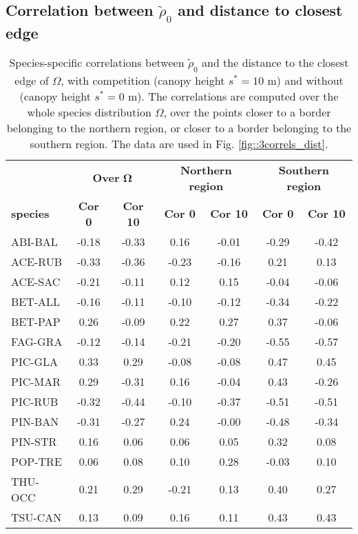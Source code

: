 \documentclass[letterpaper, 12pt]{article}
\newcommand {\s}{{s}^{*}}
\theoremstyle{theo}
\begin{document}
\begin{refsection}
\begin{onehalfspace}
\subsection{Correlation between $ \tilde \rho_0 $ and distance to closest edge}
\begin{table}[ht]
\centering
\caption[$ \text{Cor}(\tilde \rho_0, \text{distance closest edge}) $]{Species-specific correlations between $ \tilde \rho_0 $ and the distance to the closest edge of $ \Omega $, with competition (canopy height $ \s = 10 $ m) and without (canopy height $ \s = 0 $ m). The correlations are computed over the whole species distribution $ \Omega $, over the points closer to a border belonging to the northern region, or closer to a border belonging to the southern region. The data are used in Fig. \ref{fig::3correls_dist}. \label{tab::R0correl_dist}}
\begin{tabular}{lcccccc}
	\toprule
	~ & \multicolumn{2}{c}{\textbf{Over} $ \bm \Omega $} & \multicolumn{2}{c}{\textbf{Northern region}} & \multicolumn{2}{c}{\textbf{Southern region}} \\
		\cmidrule(lr){2-3} \cmidrule(lr){4-5} \cmidrule(lr){6-7}
		\textbf{species} & \textbf{Cor 0} & \textbf{Cor 10} & \textbf{Cor 0} & \textbf{Cor 10} & \textbf{Cor 0} & \textbf{Cor 10} \\
	\midrule
		ABI-BAL & -0.18 & -0.33 & 0.16 & -0.01 & -0.29 & -0.42 \\
		ACE-RUB & -0.33 & -0.36 & -0.23 & -0.16 & 0.21 & 0.13 \\
		ACE-SAC & -0.21 & -0.11 & 0.12 & 0.15 & -0.04 & -0.06 \\
		BET-ALL & -0.16 & -0.11 & -0.10 & -0.12 & -0.34 & -0.22 \\
		BET-PAP & 0.26 & -0.09 & 0.22 & 0.27 & 0.37 & -0.06 \\
		FAG-GRA & -0.12 & -0.14 & -0.21 & -0.20 & -0.55 & -0.57 \\
		PIC-GLA & 0.33 & 0.29 & -0.08 & -0.08 & 0.47 & 0.45 \\
		PIC-MAR & 0.29 & -0.31 & 0.16 & -0.04 & 0.43 & -0.26 \\
		PIC-RUB & -0.32 & -0.44 & -0.10 & -0.37 & -0.51 & -0.51 \\
		PIN-BAN & -0.31 & -0.27 & 0.24 & -0.00 & -0.48 & -0.34 \\
		PIN-STR & 0.16 & 0.06 & 0.06 & 0.05 & 0.32 & 0.08 \\
		POP-TRE & 0.06 & 0.08 & 0.10 & 0.28 & -0.03 & 0.10 \\
		THU-OCC & 0.21 & 0.29 & -0.21 & 0.13 & 0.40 & 0.27 \\
		TSU-CAN & 0.13 & 0.09 & 0.16 & 0.11 & 0.43 & 0.43 \\
 	\bottomrule
\end{tabular}
\end{table}


\end{onehalfspace}
\end{refsection}
\end{document}

